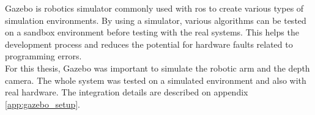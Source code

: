 Gazebo is robotics simulator commonly used with \gls{ros} to create various types of simulation environments. By using a simulator, various algorithms can be tested on a sandbox environment before testing with the real systems. This helps the development process and reduces the potential for hardware faults related to programming errors.\\

For this thesis, Gazebo was important to simulate the robotic arm and the depth camera. The whole system was tested on a simulated environment and also with real hardware. The integration details are described on appendix \ref{app:gazebo_setup}.


